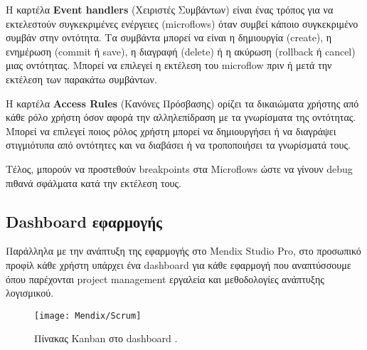                 Η καρτέλα \textbf{Event handlers} (Χειριστές Συμβάντων) είναι ένας τρόπος για να εκτελεστούν συγκεκριμένες ενέργειες (microflows) όταν συμβεί κάποιο συγκεκριμένο συμβάν στην οντότητα. Τα συμβάντα μπορεί να είναι η δημιουργία (create), η ενημέρωση (commit ή save), η διαγραφή (delete) ή η ακύρωση (rollback ή cancel) μιας οντότητας. Μπορεί να επιλεγεί η εκτέλεση του microflow πριν ή μετά την εκτέλεση των παρακάτω συμβάντων.

                Η καρτέλα \textbf{Access Rules} (Κανόνες Πρόσβασης) ορίζει τα δικαιώματα χρήστης από κάθε ρόλο χρήστη όσον αφορά την αλληλεπίδραση με τα γνωρίσματα της οντότητας. Μπορεί να επιλεγεί ποιος ρόλος χρήστη μπορεί να δημιουργήσει ή να διαγράψει στιγμιότυπα από οντότητες και να διαβάσει ή να τροποποιήσει τα γνωρίσματά τους.

                Τέλος, μπορούν να προστεθούν breakpoints στα Microflows ώστε να γίνουν debug πιθανά σφάλματα κατά την εκτέλεση τους.

            \subsection{Dashboard εφαρμογής}
                Παράλληλα με την ανάπτυξη της εφαρμογής στο Mendix Studio Pro, στο προσωπικό προφίλ κάθε χρήστη υπάρχει ένα dashboard για κάθε εφαρμογή που αναπτύσσουμε όπου παρέχονται project management εργαλεία και μεθοδολογίες ανάπτυξης λογισμικού.

                \begin{figure}[h!] \noindent \centering
                    \texttt{[image: Mendix/Scrum]}
                    \caption{\centering Πίνακας Kanban στο dashboard \cite{mendixDoc}.}
                \end{figure}
